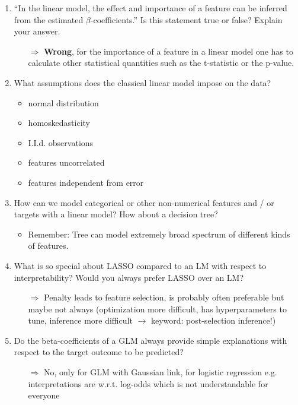 \begin{enumerate}
\begin{itemize}
        \end{itemize}
    	\item ``In the linear model, the effect and importance of a feature can be inferred from the estimated $\beta$-coefficients.'' Is this statement true or false? Explain your answer.
    	\begin{itemize}
    		\item[$\Rightarrow$] \textbf{Wrong}, for the importance of a feature in a linear model one has to calculate other statistical quantities such as the t-statistic or the p-value.
    	\end{itemize}
        \item What assumptions does the classical linear model impose on the data?
        \begin{itemize}
            \item normal distribution
            \item homoskedasticity
            \item I.I.d. observations
            \item features uncorrelated
            \item features independent from error
        \end{itemize}
        \item How can we model categorical or other non-numerical features and / or targets with a linear model? How about a decision tree?
        \begin{itemize}
            \item Remember: Tree can model extremely broad spectrum of different kinds of features.
        \end{itemize}
    	\item What is so special about LASSO compared to an LM with respect to interpretability? Would you always prefer LASSO over an LM?
    	\begin{itemize}
    		\item[$\Rightarrow$] Penalty leads to feature selection, is probably often preferable but maybe not always (optimization more difficult, has hyperparameters to tune, inference more difficult $\rightarrow$ keyword: post-selection inference!)
    	\end{itemize}
    	\item Do the beta-coefficients of a GLM always provide simple explanations with respect to the target outcome to be predicted? 
    	\begin{itemize}
    		\item[$\Rightarrow$] No, only for GLM with Gaussian link, for logistic regression e.g. interpretations are w.r.t. log-odds which is not understandable for everyone

\end{itemize}
\end{enumerate}
